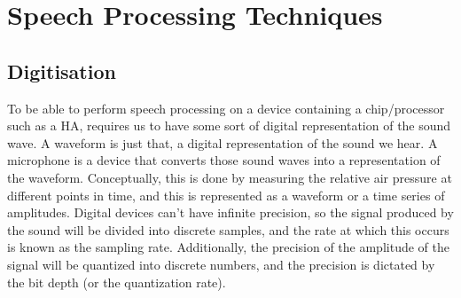 \documentclass[logo,bsc,singlespacing,parskip,online]{infthesis}
\begin{document}


\section{Speech Processing Techniques}
\subsection{Digitisation}
To be able to perform speech processing on a device containing a chip/processor such as a HA, requires us 
to have some sort of digital representation of the sound wave. A waveform is just that, a digital representation 
of the sound we hear. A microphone is a device that converts those sound waves into a representation of the 
waveform. Conceptually, this is done by measuring the relative air pressure at different points in time, and 
this is represented as a waveform or a time series of amplitudes. Digital devices can't have infinite precision, so the signal produced by the sound will 
be divided into discrete samples, and the rate at which this occurs is known as the sampling rate. Additionally,
the precision of the amplitude of the signal will be quantized into discrete numbers, and the precision is 
dictated by the bit depth (or the quantization rate).
\end{document}
